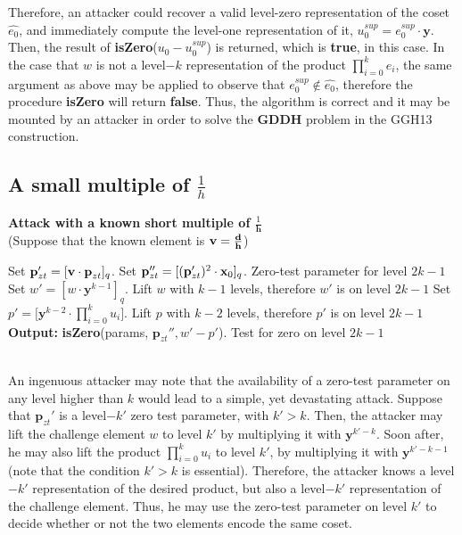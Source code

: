 Therefore, an attacker could recover a valid level-zero representation of the coset $\widehat{e_0}$, and immediately compute the level-one representation of it, $u_0^{sup} = e_0^{sup} \cdot \textbf{y}$. Then, the result of \textbf{isZero}($u_0 - u_0^{sup}$) is returned, which is \textbf{true}, in this case. In the case that $w$ is not a level$-k$ representation of the product $\displaystyle{\prod_{i = 0}^{k}e_i}$, the same argument as above may be applied to observe that $e_0^{sup} \notin \widehat{e_0}$, therefore the procedure \textbf{isZero} will return \textbf{false}. Thus, the algorithm is correct and it may be mounted by an attacker in order to solve the \textbf{GDDH} problem in the GGH13 construction.

\subsection{A small multiple of $\frac{1}{h}$}

\begin{tcolorbox}[colframe=black,colback=white,arc=0pt,outer arc=0pt]
	\begin{center}
		\textbf{Attack with a known short multiple of $\frac{1}{\textbf{h}}$}\\
		(Suppose that the known element is $\textbf{v} = \frac{\textbf{d}}{\textbf{h}}$)
	\end{center}
	\begin{algorithmic}[1]
		\State Set $\textbf{p}_{zt}' = [\textbf{v} \cdot \textbf{p}_{zt}]_q$.
		\Statex
		\State Set $\textbf{p}_{zt}'' = [(\textbf{p}_{zt}')^2 \cdot \textbf{x}_0]_q$. \Comment Zero-test parameter for level $2k-1$
		\Statex
		\State Set $w' = [w \cdot \textbf{y}^{k-1}]_q$. \Comment Lift $w$ with $k-1$ levels, therefore $w'$ is on level $2k-1$
		\Statex
		\State Set $p' = \bigg[ \displaystyle{\textbf{y}^{k-2} \cdot \prod_{i = 0}^{k} u_i} \bigg]$. \Comment Lift $p$ with $k-2$ levels, therefore $p'$ is on level $2k-1$
		\Statex
		\State \textbf{Output:} \textbf{isZero}(params, $\textbf{p}_{zt}'', w' - p'$). \Comment Test for zero on level $2k-1$
	\end{algorithmic}
\end{tcolorbox}
~\\

An ingenuous attacker may note that the availability of a zero-test parameter on any level higher than $k$ would lead to a simple, yet devastating attack. Suppose that $\textbf{p}_{zt}'$ is a level$-k'$ zero test parameter, with $k' > k.$ Then, the attacker may lift the challenge element $w$ to level $k'$ by multiplying it with $\textbf{y}^{k' - k}$. Soon after, he may also lift the product $\displaystyle{\prod_{i = 0}^{k} u_i}$ to level $k'$, by multiplying it with $\textbf{y}^{k' - k -1}$ (note that the condition $k' > k$ is essential). Therefore, the attacker knows a level$-k'$ representation of the desired product, but also a level$-k'$ representation of the challenge element. Thus, he may use the zero-test parameter on level $k'$ to decide whether or not the two elements encode the same coset.\\

